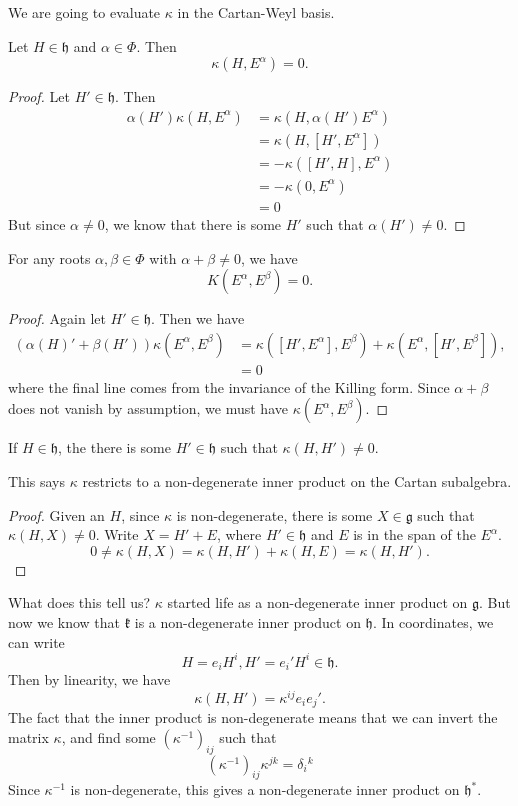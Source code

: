 \documentclass[a4paper]{article}
\begin{document}
We are going to evaluate $\kappa$ in the Cartan-Weyl basis.

\begin{lemma}
  Let $H \in \mathfrak{h}$ and $\alpha \in \Phi$. Then
  \[
    \kappa(H, E^\alpha) = 0.
  \]
\end{lemma}
\begin{proof}
  Let $H' \in \mathfrak{h}$. Then
  \begin{align*}
    \alpha(H')\kappa(H, E^\alpha) &= \kappa(H, \alpha(H') E^\alpha) \\
    &= \kappa(H, [H', E^\alpha])\\
    &= -\kappa([H', H], E^\alpha)\\
    &= -\kappa(0, E^\alpha)\\
    &= 0
  \end{align*}
  But since $\alpha \not= 0$, we know that there is some $H'$ such that $\alpha(H') \not= 0$.
\end{proof}

\begin{lemma}
  For any roots $\alpha, \beta \in \Phi$ with $\alpha + \beta \not= 0$, we have
  \[
    K(E^\alpha, E^\beta) = 0.
  \]
\end{lemma}

\begin{proof}
  Again let $H' \in \mathfrak{h}$. Then we have
  \begin{align*}
    (\alpha(H)' + \beta(H')) \kappa(E^\alpha, E^\beta) &= \kappa([H', E^\alpha], E^\beta) + \kappa(E^\alpha, [H', E^\beta]),\\
    &= 0
  \end{align*}
  where the final line comes from the invariance of the Killing form. Since $\alpha + \beta$ does not vanish by assumption, we must have $\kappa(E^\alpha, E^\beta)$.
\end{proof}

\begin{lemma}
  If $H \in \mathfrak{h}$, the there is some $H' \in \mathfrak{h}$ such that $\kappa(H, H') \not= 0$.
\end{lemma}
This says $\kappa$ restricts to a non-degenerate inner product on the Cartan subalgebra.

\begin{proof}
  Given an $H$, since $\kappa$ is non-degenerate, there is some $X \in \mathfrak{g}$ such that $\kappa (H, X) \not= 0$. Write $X = H' + E$, where $H' \in \mathfrak{h}$ and $E$ is in the span of the $E^\alpha$.
  \[
    0\not= \kappa(H, X) = \kappa(H, H') + \kappa(H, E) = \kappa(H, H').
  \]
\end{proof}
What does this tell us? $\kappa$ started life as a non-degenerate inner product on $\mathfrak{g}$. But now we know that $\mathfrak{k}$ is a non-degenerate inner product on $\mathfrak{h}$. In coordinates, we can write
\[
  H = e_i H^i, H'= e_i' H^i \in \mathfrak{h}.
\]
Then by linearity, we have
\[
  \kappa(H, H') = \kappa^{ij} e_i e_j'.
\]
The fact that the inner product is non-degenerate means that we can invert the matrix $\kappa$, and find some $(\kappa^{-1})_{ij}$ such that
\[
  (\kappa^{-1})_{ij} \kappa^{jk} = \delta_i\!^k
\]
Since $\kappa^{-1}$ is non-degenerate, this gives a non-degenerate inner product on $\mathfrak{h}^*$.
\end{document}
